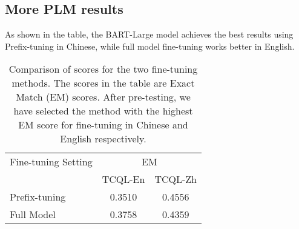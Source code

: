 \documentclass[11pt]{article}
\begin{document}
\begin{CJK*}{UTF8}{gbsn}
\subsection{More PLM results}
As shown in the table, the BART-Large model achieves the best results using Prefix-tuning in Chinese, while full model fine-tuning works better in English.
\begin{table}[h!]
\centering
\begin{tabular}{p{8em}cc}
\toprule
 Fine-tuning Setting& \multicolumn{2}{c}{EM} \\
 & TCQL-En & TCQL-Zh \\
\midrule
Prefix-tuning & 0.3510 & 0.4556 \\
Full Model & 0.3758 & 0.4359 \\
\bottomrule
\end{tabular}
\caption{Comparison of scores for the two fine-tuning methods. The scores in the table are Exact Match (EM) scores. After pre-testing, we have selected the method with the highest EM score for fine-tuning in Chinese and English respectively.}
\label{tab:morePLM}
\end{table}


\end{CJK*}
\end{document}
